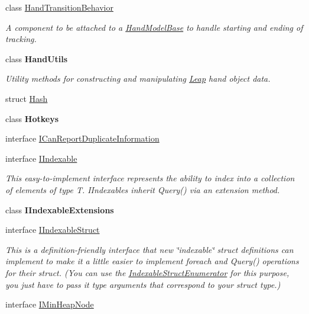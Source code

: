 \begin{DoxyCompactItemize}
class \mbox{\hyperlink{class_leap_1_1_unity_1_1_hand_transition_behavior}{Hand\+Transition\+Behavior}}
\begin{DoxyCompactList}\small\item\em A component to be attached to a \mbox{\hyperlink{class_leap_1_1_unity_1_1_hand_model_base}{Hand\+Model\+Base}} to handle starting and ending of tracking. \end{DoxyCompactList}\item 
class {\bfseries Hand\+Utils}
\begin{DoxyCompactList}\small\item\em Utility methods for constructing and manipulating \mbox{\hyperlink{namespace_leap_1_1_unity_1_1_leap}{Leap}} hand object data. \end{DoxyCompactList}\item 
struct \mbox{\hyperlink{struct_leap_1_1_unity_1_1_hash}{Hash}}
\item 
class {\bfseries Hotkeys}
\item 
interface \mbox{\hyperlink{interface_leap_1_1_unity_1_1_i_can_report_duplicate_information}{I\+Can\+Report\+Duplicate\+Information}}
\item 
interface \mbox{\hyperlink{interface_leap_1_1_unity_1_1_i_indexable}{I\+Indexable}}
\begin{DoxyCompactList}\small\item\em This easy-\/to-\/implement interface represents the ability to index into a collection of elements of type T. I\+Indexables inherit Query() via an extension method. \end{DoxyCompactList}\item 
class {\bfseries I\+Indexable\+Extensions}
\item 
interface \mbox{\hyperlink{interface_leap_1_1_unity_1_1_i_indexable_struct}{I\+Indexable\+Struct}}
\begin{DoxyCompactList}\small\item\em This is a definition-\/friendly interface that new \char`\"{}indexable\char`\"{} struct definitions can implement to make it a little easier to implement foreach and Query() operations for their struct. (You can use the \mbox{\hyperlink{struct_leap_1_1_unity_1_1_indexable_struct_enumerator}{Indexable\+Struct\+Enumerator}} for this purpose, you just have to pass it type arguments that correspond to your struct type.) \end{DoxyCompactList}\item 
interface \mbox{\hyperlink{interface_leap_1_1_unity_1_1_i_min_heap_node}{I\+Min\+Heap\+Node}}

\end{DoxyCompactItemize}
